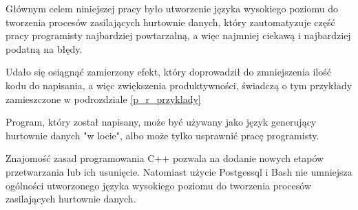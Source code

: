 Głównym celem niniejszej pracy było utworzenie języka wysokiego poziomu do tworzenia procesów zasilających hurtownie danych,
 który zautomatyzuje część pracy programisty najbardziej powtarzalną, a więc najmniej ciekawą i najbardziej podatną na błędy.

Udało się osiągnąć zamierzony efekt,
 który doprowadził do zmniejszenia ilość kodu do napisania, 
 a więc zwiększenia produktywności,
 świadczą o tym przykłady zamieszczone w podrozdziale \ref{p_r_przyklady}

Program, który został napisany, może być używany jako język generujący hurtownie danych "w locie",
 albo może tylko usprawnić pracę programisty.

Znajomość zasad programowania C++ pozwala na dodanie nowych etapów przetwarzania lub ich usunięcie.
Natomiast użycie Postgessql i Bash nie umniejsza ogólności utworzonego języka wysokiego poziomu
 do tworzenia procesów zasilających hurtownie danych.

